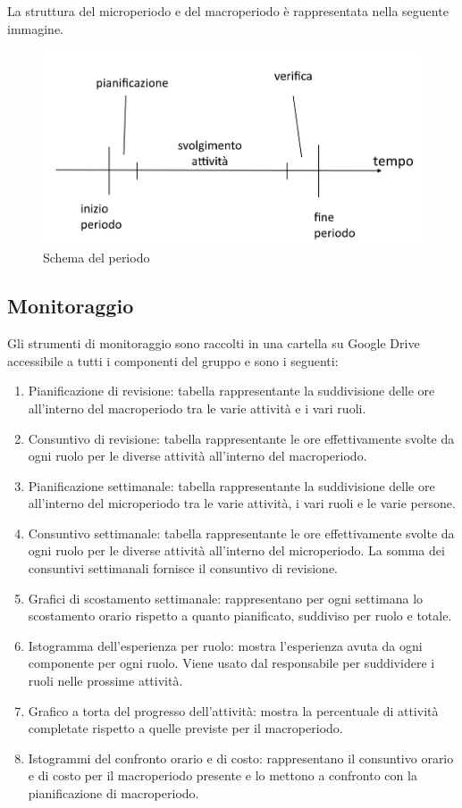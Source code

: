 La struttura del microperiodo e del macroperiodo è rappresentata nella seguente immagine.
\begin{figure}[H]
	\centering
	\includegraphics[width=0.7\linewidth]{res/images/schema_periodo.png}
	\caption{Schema del periodo}
	\label{fig:linea_tempo_periodo}
\end{figure}

\subsection{Monitoraggio}
Gli strumenti di monitoraggio sono raccolti in una cartella su Google Drive accessibile a tutti i componenti del gruppo e sono i seguenti:
\begin{enumerate}
	\item Pianificazione di revisione: tabella rappresentante la suddivisione delle ore all'interno del macroperiodo tra le varie attività e i vari ruoli.
	\item Consuntivo di revisione: tabella rappresentante le ore effettivamente svolte da ogni ruolo per le diverse attività all'interno del macroperiodo.
	\item Pianificazione settimanale: tabella rappresentante la suddivisione delle ore all'interno del microperiodo tra le varie attività, i vari ruoli e le varie persone.
	\item Consuntivo settimanale: tabella rappresentante le ore effettivamente svolte da ogni ruolo per le diverse attività all'interno del microperiodo. La somma dei consuntivi settimanali fornisce il consuntivo di revisione.
	\item Grafici di scostamento settimanale: rappresentano per ogni settimana lo scostamento orario rispetto a quanto pianificato, suddiviso per ruolo e totale.
	\item Istogramma dell'esperienza per ruolo: mostra l'esperienza avuta da ogni componente per ogni ruolo. Viene usato dal responsabile per suddividere i ruoli nelle prossime attività.
	\item Grafico a torta del progresso dell'attività: mostra la percentuale di attività completate rispetto a quelle previste per il macroperiodo.
	\item Istogrammi del confronto orario e di costo: rappresentano il consuntivo orario e di costo per il macroperiodo presente e lo mettono a confronto con la pianificazione di macroperiodo.
\end{enumerate}

